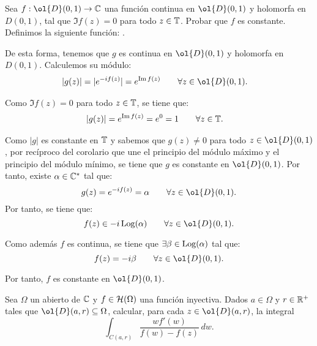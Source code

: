 \begin{ejercicio}
    Sea $f : \ol{D}(0,1) \to \bb{C}$ una función continua en $\ol{D}(0,1)$ y holomorfa en $D(0,1)$, tal que $\Im f(z) = 0$ para todo $z\in \mathbb{T}$. Probar que $f$ es constante.\\

    Definimos la siguiente función:
    .

    De esta forma, tenemos que $g$ es continua en $\ol{D}(0,1)$ y holomorfa en $D(0,1)$. Calculemos su módulo:
    \begin{align*}
        |g(z)| &= |e^{-i f(z)}| = e^{\Im f(z)}\qquad \forall z\in \ol{D}(0,1).
    \end{align*}

    Como $\Im f(z) = 0$ para todo $z\in \mathbb{T}$, se tiene que:
    \begin{align*}
        |g(z)| &= e^{\operatorname{Im} f(z)} = e^{0} = 1\qquad \forall z\in \mathbb{T}.
    \end{align*}

    Como $|g|$ es constante en $\mathbb{T}$ y sabemos que $g(z) \neq 0$ para todo $z\in \ol{D}(0,1)$, por recíproco del corolario que une el principio del módulo máximo y el principio del módulo mínimo, se tiene que $g$ es constante en $\ol{D}(0,1)$. Por tanto, existe $\alpha\in \mathbb{C}^*$ tal que:
    \begin{equation*}
        g(z) = e^{-i f(z)} = \alpha \qquad \forall z\in \ol{D}(0,1).
    \end{equation*}
    Por tanto, se tiene que:
    \begin{equation*}
        f(z) \in -i \Log(\alpha) \qquad \forall z\in \ol{D}(0,1).
    \end{equation*}

    Como además $f$ es continua, se tiene que $\exists \beta\in \operatorname{Log}(\alpha)$ tal que:
    \begin{equation*}
        f(z) = -i\beta \qquad \forall z\in \ol{D}(0,1).
    \end{equation*}

    Por tanto, $f$ es constante en $\ol{D}(0,1)$.
\end{ejercicio}

\begin{ejercicio}
    Sea $\Omega$ un abierto de $\mathbb{C}$ y $f\in \mathcal{H}(\Omega)$ una función inyectiva. Dados $a\in \Omega$ y $r\in \mathbb{R}^+$ tales que $\ol{D}(a,r) \subseteq \Omega$, calcular, para cada $z\in \ol{D}(a,r)$, la integral
    \begin{equation*}
        \int_{C(a,r)} \frac{w f'(w)}{f(w) - f(z)} \, dw.
    \end{equation*}
\end{ejercicio}
